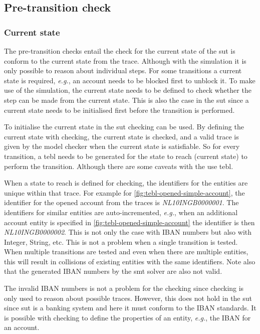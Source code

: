 \subsection{Pre-transition check}

\subsubsection*{Current state}\label{sec:ch5-current-state}

The pre-transition checks entail the check for the current state of the \gls{sut} is
conform to the current state from the trace. Although with the simulation it is
only possible to reason about individual steps. For some transitions a current
state is required, \textit{e.g.}, an account needs to be blocked first to
unblock it. To make use of the simulation, the current state needs to be defined
to check whether the step can be made from the current state. This is also the
case in the \gls{sut} since a current state needs to be initialised first before the
transition is performed.

To initialise the current state in the \gls{sut} checking can be used. By defining
the current state with checking, the current state is checked, and a valid trace
is given by the model checker when the current state is satisfiable. So for
every transition, a tebl needs to be generated for the state to reach
(current state) to perform the transition. Although there are some caveats with
the use tebl.

When a state to reach is defined for checking, the identifiers for the entities
are unique within that trace. For example for
\autoref{fig:tebl-opened-simple-account}, the identifier for the opened account
from the traces is \textit{NL10INGB0000001}. The identifiers for similar
entities are auto-incremented, \textit{e.g.}, when an additional account entity
is specified in \autoref{fig:tebl-opened-simple-account} the identifier is then
\textit{NL10INGB0000002}. This is not only the case with IBAN numbers but also
with Integer, String, etc. This is not a problem when a single transition is
tested. When multiple transitions are tested and even when there are multiple
entities, this will result in collisions of existing entities with the same
identifiers. Note also that the generated IBAN numbers by the \gls{smt} solver are
also not valid.

The invalid IBAN numbers is not a problem for the
checking since checking is only used to reason about possible traces. However,
this does not hold in the \gls{sut} since \gls{sut} is a banking system and here it must
conform to the IBAN standards. It is possible with checking to define the
properties of an entity, \textit{e.g.}, the IBAN for an account.

